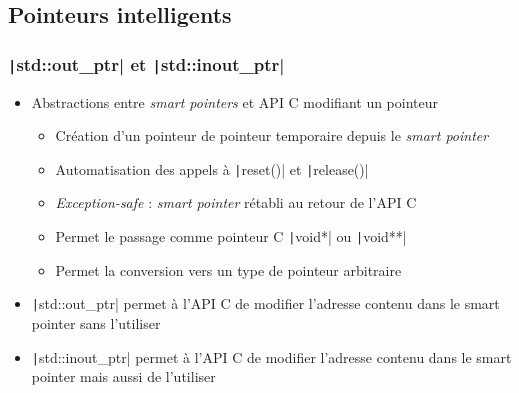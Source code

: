 \documentclass[C++.tex]{subfiles}
\begin{document}
\subsection*{Pointeurs intelligents}
\begin{frame}[fragile]
	\frametitle{\texttt|std::out_ptr| et \texttt|std::inout_ptr|}
	\begin{itemize}
		\item Abstractions entre \textit{smart pointers} et API C modifiant un pointeur


		\begin{itemize}
			\item Création d'un pointeur de pointeur temporaire depuis le \textit{smart pointer}
			\item Automatisation des appels à \texttt|reset()| et \texttt|release()|
			\item \textit{Exception-safe} : \textit{smart pointer} rétabli au retour de l'API C	


			\item Permet le passage comme pointeur C \texttt|void*| ou \texttt|void**|
			\item Permet la conversion vers un type de pointeur arbitraire
		\end{itemize}
		\item \texttt|std::out_ptr| permet à l'API C de modifier l'adresse contenu dans le smart pointer sans l'utiliser
		\item \texttt|std::inout_ptr| permet à l'API C de modifier l'adresse contenu dans le smart pointer mais aussi de l'utiliser
	\end{itemize}
\end{frame}
\end{document}

